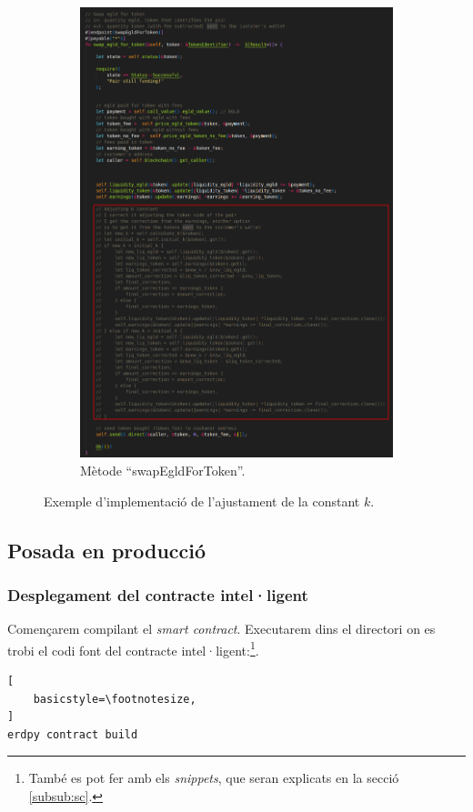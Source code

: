 \documentclass[11pt,a4paper]{article}
\makeatletter
\renewcommand\footnotesize{%
   \@setfontsize\footnotesize\@ixpt{9}%
   \abovedisplayskip 8\p@ \@plus2\p@ \@minus4\p@
   \abovedisplayshortskip \z@ \@plus\p@
   \belowdisplayshortskip 4\p@ \@plus2\p@ \@minus2\p@
   \def\@listi{\leftmargin\leftmargini
               \topsep 4\p@ \@plus2\p@ \@minus2\p@
               \parsep 2\p@ \@plus\p@ \@minus\p@
               \itemsep \parsep}%
   \belowdisplayskip \abovedisplayskip
}
\makeatother
\begin{document}
\begin{figure}[!htb]
\begin{subfigure}[b]{0.47\textwidth}
  \includegraphics[width=\linewidth]{imp-sc02.png}
  \caption{Mètode ``swapEgldForToken''.}\label{fig:impsc02}
\end{subfigure}\hfill
\caption{Exemple d'implementació de l'ajustament de la constant \(k\).}
\label{fig:impcorrectk}
\end{figure}

\subsection{Posada en producció}
\subsubsection{Desplegament del contracte intel·ligent}
Començarem compilant el \textit{smart contract}. Executarem dins el directori on es trobi el codi font del contracte intel·ligent:\footnote{També es pot fer amb els \textit{snippets}, que seran explicats en la secció \ref{subsub:sc}.}.
\begin{lstlisting}[
    basicstyle=\footnotesize,
]
erdpy contract build
\end{lstlisting}
\end{document}
